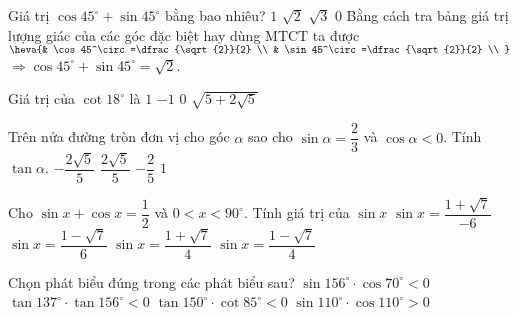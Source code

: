 \begin{ex}
	Giá trị $\cos 45^\circ+\sin 45^\circ$ bằng bao nhiêu?
	\choice
	{$1$}
	{\True $\sqrt{2}$}
	{$\sqrt{3}$}
	{$0$}
	\loigiai
	{Bằng cách tra bảng giá trị lượng giác của các góc đặc biệt hay dùng MTCT ta được $\heva{& \cos 45^\circ=\dfrac{\sqrt{2}}{2} \\
				& \sin 45^\circ=\dfrac{\sqrt{2}}{2} \\
			}$\\
		$\Rightarrow \cos 45^\circ+\sin 45^\circ=\sqrt{2}$.}
\end{ex}
\begin{ex}
	Giá trị của $\cot18^\circ$ là
	\choice
	{$1$}
	{$-1$}
	{$0$}
	{\True $\sqrt{5+2\sqrt{5}}$}
\end{ex}
\begin{ex}
	Trên nửa đường tròn đơn vị cho góc $\alpha$ sao cho $\sin\alpha=\dfrac{2}{3}$ và $\cos\alpha<0$. Tính $\tan\alpha$.
	\choice
	{\True $-\dfrac{2\sqrt{5}}{5}$}
	{$\dfrac{2\sqrt{5}}{5}$}
	{$-\dfrac{2}{5}$}
	{$1$}
\end{ex}
\begin{ex}
	Cho $\sin x+\cos x=\dfrac{1}{2}$ và $0<x<90^\circ$. Tính giá trị của $\sin x$
	\choice
	{$\sin x=\dfrac{1+\sqrt{7}}{-6}$}
	{$\sin x=\dfrac{1-\sqrt{7}}{6}$}
	{\True $\sin x=\dfrac{1+\sqrt{7}}{4}$}
	{$\sin x=\dfrac{1-\sqrt{7}}{4}$}
\end{ex}
\begin{ex}
	Chọn phát biểu đúng trong các phát biểu sau?
	\choice
	{$\sin 156^\circ\cdot\cos70^\circ<0$}
	{$\tan 137^\circ\cdot\tan 156^\circ<0$}
	{\True $\tan150^\circ\cdot\cot85^\circ<0$}
	{$\sin 110^\circ\cdot\cos 110^\circ>0$}
\end{ex}
